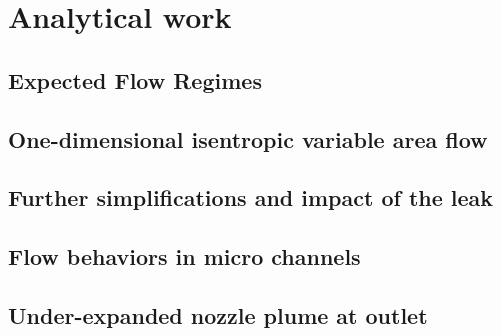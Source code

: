 \section{Analytical work}


\subsection{Expected Flow Regimes}

\newpage

\subsection{One-dimensional isentropic variable area flow}
\label{sec:one-dim-isentropic}

\newpage

\subsection{Further simplifications and impact of the leak}

\newpage

\subsection{Flow behaviors in micro channels}

\newpage

\subsection{Under-expanded nozzle plume at outlet}

\newpage
